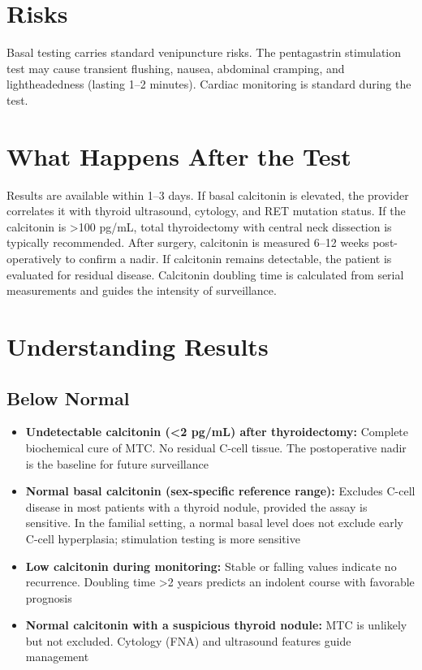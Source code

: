 \section*{Risks}
Basal testing carries standard venipuncture risks. The pentagastrin stimulation test may cause transient flushing, nausea, abdominal cramping, and lightheadedness (lasting 1--2 minutes). Cardiac monitoring is standard during the test.

\section*{What Happens After the Test}
Results are available within 1--3 days. If basal calcitonin is elevated, the provider correlates it with thyroid ultrasound, cytology, and RET mutation status. If the calcitonin is >100 pg/mL, total thyroidectomy with central neck dissection is typically recommended. After surgery, calcitonin is measured 6--12 weeks post-operatively to confirm a nadir. If calcitonin remains detectable, the patient is evaluated for residual disease. Calcitonin doubling time is calculated from serial measurements and guides the intensity of surveillance.

\section*{Understanding Results}

\subsection*{Below Normal}
\begin{itemize}
  \item \textbf{Undetectable calcitonin (<2 pg/mL) after thyroidectomy:} Complete biochemical cure of MTC. No residual C-cell tissue. The postoperative nadir is the baseline for future surveillance
  \item \textbf{Normal basal calcitonin (sex-specific reference range):} Excludes C-cell disease in most patients with a thyroid nodule, provided the assay is sensitive. In the familial setting, a normal basal level does not exclude early C-cell hyperplasia; stimulation testing is more sensitive
  \item \textbf{Low calcitonin during monitoring:} Stable or falling values indicate no recurrence. Doubling time >2 years predicts an indolent course with favorable prognosis
  \item \textbf{Normal calcitonin with a suspicious thyroid nodule:} MTC is unlikely but not excluded. Cytology (FNA) and ultrasound features guide management
\end{itemize}

